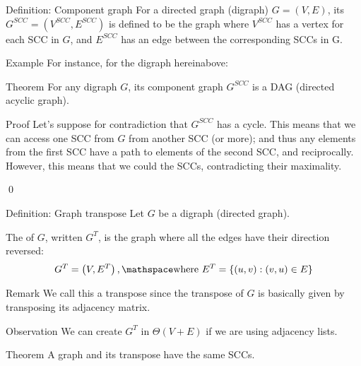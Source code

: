 \documentclass[a4paper]{article}
\begin{document}
\begin{parag}{Definition:  Component graph}
    For a directed graph (digraph) $G = \left(V, E\right)$, its  $G^{SCC} = \left(V^{S C C}, E^{S C C}\right)$ is defined to be the graph where $V^{S C C}$ has a vertex for each SCC in $G$, and $E^{S C C}$ has an edge between the corresponding SCCs in G.

    \begin{subparag}{Example}
        For instance, for the digraph hereinabove:
    \end{subparag}
\end{parag}

\begin{parag}{Theorem}
    For any digraph $G$, its component graph $G^{SCC}$ is a DAG (directed acyclic graph).

    \begin{subparag}{Proof}
        Let's suppose for contradiction that $G^{S C C}$ has a cycle.  This means that we can access one SCC from $G$ from another SCC (or more); and thus any elements from the first SCC have a path to elements of the second SCC, and reciprocally. However, this means that we could the SCCs, contradicting their maximality.

        \qed
    \end{subparag}
\end{parag}

\begin{parag}{Definition: Graph transpose}
    Let $G$ be a digraph (directed graph). 

    The  of $G$, written $G^T$, is the graph where all the edges have their direction reversed:
    \[G^T = \left(V, E^T\right), \mathspace \text{where } E^T = \left\{\left(u, v\right) : \left(v, u\right) \in E\right\}\]
    \begin{subparag}{Remark}
        We call this a transpose since the transpose of $G$ is basically given by transposing its adjacency matrix.
    \end{subparag}

    \begin{subparag}{Observation}
        We can create $G^T$ in $\Theta\left(V + E\right)$ if we are using adjacency lists.
    \end{subparag}
\end{parag}

\begin{parag}{Theorem}
    A graph and its transpose have the same SCCs.
\end{parag}
\end{document}
